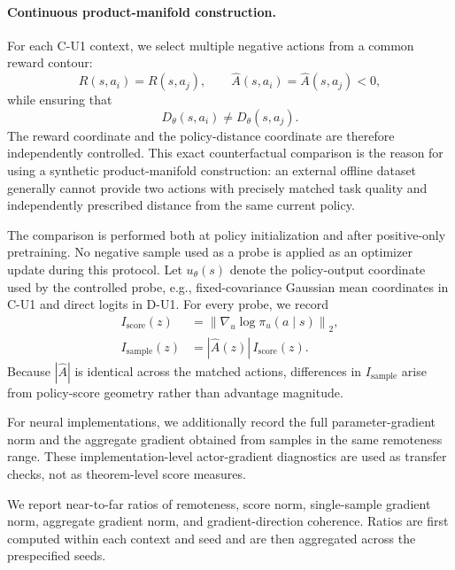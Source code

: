 \documentclass{article}
\theoremstyle{plain}
\theoremstyle{definition}
\theoremstyle{remark}
\begin{document}
\paragraph{Continuous product-manifold construction.}
For each C-U1 context, we select multiple negative actions from a common
reward contour:
\begin{equation}
    R(s,a_i)
    =
    R(s,a_j),
    \qquad
    \widehat A(s,a_i)
    =
    \widehat A(s,a_j)
    <0,
    \label{eq:source_equal_quality}
\end{equation}
while ensuring that
\begin{equation}
    D_\theta(s,a_i)
    \neq
    D_\theta(s,a_j).
    \label{eq:source_different_remoteness}
\end{equation}
The reward coordinate and the policy-distance coordinate are therefore
independently controlled. This exact counterfactual comparison is the
reason for using a synthetic product-manifold construction: an external
offline dataset generally cannot provide two actions with precisely
matched task quality and independently prescribed distance from the
same current policy.

The comparison is performed both at policy initialization and after
positive-only pretraining. No negative sample used as a probe is applied
as an optimizer update during this protocol. Let \(u_\theta(s)\) denote
the policy-output coordinate used by the controlled probe, e.g.,
fixed-covariance Gaussian mean coordinates in C-U1 and direct logits in
D-U1. For every probe, we record
\begin{equation}
\begin{aligned}
I_{\mathrm{score}}(z)
&=
\left\|
\nabla_{u}\log \pi_{u}(a\mid s)
\right\|_2,\\
I_{\mathrm{sample}}(z)
&=
|\widehat A(z)|\, I_{\mathrm{score}}(z).
\end{aligned}
\label{eq:source_influence_metrics}
\end{equation}
Because \(|\widehat A|\) is identical across the matched actions,
differences in \(I_{\mathrm{sample}}\) arise from policy-score geometry
rather than advantage magnitude.

For neural implementations, we additionally record the full
parameter-gradient norm and the aggregate gradient obtained from samples
in the same remoteness range. These implementation-level actor-gradient
diagnostics are used as transfer checks, not as theorem-level score
measures.

We report near-to-far ratios of remoteness, score norm, single-sample
gradient norm, aggregate gradient norm, and gradient-direction
coherence. Ratios are first computed within each context and seed and
are then aggregated across the prespecified seeds.
\end{document}
